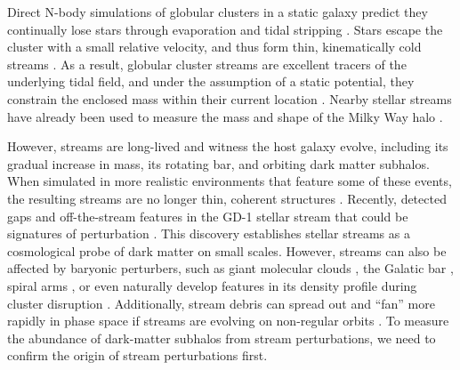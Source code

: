 \documentclass[twocolumn]{aastex62}
\begin{document}
Direct N-body simulations of globular clusters in a static galaxy predict they continually lose stars through evaporation and tidal stripping \citep[e.g.,][]{Baumgardt:2003}.
Stars escape the cluster with a small relative velocity, and thus form thin, kinematically cold streams \citep[e.g.,][]{Combes:1999}.
As a result, globular cluster streams are excellent tracers of the underlying tidal field, and under the assumption of a static potential, they constrain the enclosed mass within their current location \citep{Bonaca:2018}.
Nearby stellar streams have already been used to measure the mass and shape of the Milky Way halo \citep[e.g.,][]{Koposov:2010, Kupper:2015, Bovy:2016}.

However, streams are long-lived and witness the host galaxy evolve, including its gradual increase in mass, its rotating bar, and orbiting dark matter subhalos.
When simulated in more realistic environments that feature some of these events, the resulting streams are no longer 
thin, coherent structures \citep[e.g.,][]{Bonaca:2014, Ngan:2015, Price-Whelan:2016b}. Recently, \citet{Price-Whelan:2018} detected gaps and off-the-stream features in the GD-1 stellar stream that could be signatures of perturbation \citep{Bonaca:2018b}.
This discovery establishes stellar streams as a cosmological probe of dark matter on small scales.
However, streams can also be affected by baryonic perturbers, such as giant molecular clouds \citep{Amorisco:2016}, the Galatic bar \citep{Pearson:2017}, spiral arms \citep{Banik:2019}, or even naturally develop features in its density profile during cluster disruption \citep[e.g.,][]{Kupper:2008, Just:2009}. Additionally, stream debris can spread out and ``fan'' more rapidly in phase space if streams are evolving on non-regular orbits \citep[e.g.,][]{Pearson:2015, Fardal:2015, Price-Whelan:2016}.
To measure the abundance of dark-matter subhalos from stream perturbations, we need to confirm the origin of stream perturbations first.
\end{document}
